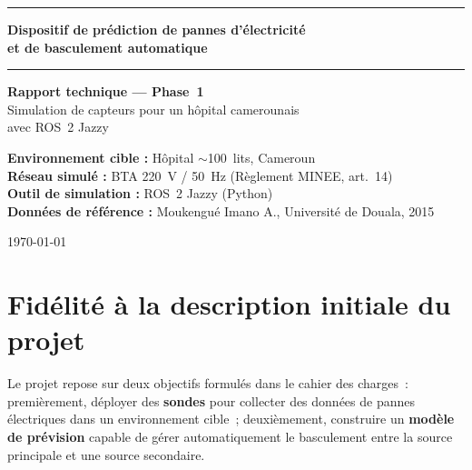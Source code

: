 \documentclass[12pt,a4paper]{article}
\begin{document}

\begin{titlepage}
  \centering
  \vspace*{1.5cm}

  {\color{bleuCMR}\rule{\linewidth}{2pt}}
  \vspace{0.4cm}

  {\LARGE\bfseries Dispositif de prédiction de pannes d'électricité\\
  et de basculement automatique}

  \vspace{0.3cm}
  {\color{bleuCMR}\rule{\linewidth}{0.8pt}}

  \vspace{1cm}
  {\large\bfseries Rapport technique — Phase~1}\\
  \vspace{0.3cm}
  {\large Simulation de capteurs pour un hôpital camerounais\\
  avec ROS~2 Jazzy}

  \vspace{2cm}

  \begin{mdframed}[style=encadre]
    \centering
    \textbf{Environnement cible :} Hôpital $\sim$100~lits, Cameroun\\
    \textbf{Réseau simulé :} BTA 220~V / 50~Hz (Règlement MINEE, art.~14)\\
    \textbf{Outil de simulation :} ROS~2 Jazzy (Python)\\
    \textbf{Données de référence :} Moukengué Imano A.,
    Université de Douala, 2015
  \end{mdframed}

  \vfill
  {\small\today}
\end{titlepage}

\tableofcontents
\newpage

\section{Fidélité à la description initiale du projet}

Le projet repose sur deux objectifs formulés dans le cahier des charges~:
premièrement, déployer des \textbf{sondes} pour collecter des données
de pannes électriques dans un environnement cible~; deuxièmement,
construire un \textbf{modèle de prévision} capable de gérer automatiquement
le basculement entre la source principale et une source secondaire.
\end{document}
